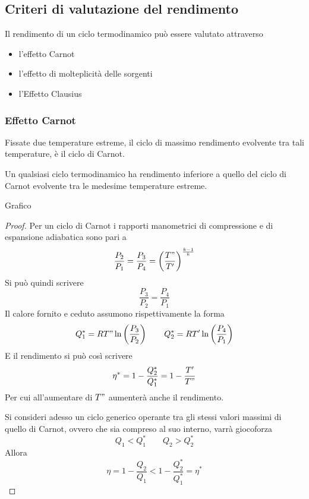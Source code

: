 \subsection{Criteri di valutazione del rendimento}
\begin{adjustwidth}{2in}{}
	Il rendimento di un ciclo termodinamico può essere valutato attraverso 
	\begin{itemize}
		\item l'effetto Carnot
		\item l'effetto di molteplicità delle sorgenti 
		\item l'Effetto Clausius
	\end{itemize}
\end{adjustwidth}





\subsubsection{Effetto Carnot}
\begin{adjustwidth}{2in}{}
	\begin{en}
		Fissate due temperature estreme, il ciclo di massimo rendimento evolvente tra tali temperature, è il ciclo di Carnot. 
		
		Un qualsiasi ciclo termodinamico ha rendimento inferiore a quello del ciclo di Carnot evolvente tra le medesime temperature estreme.
	\end{en}
	
	Grafico
	
	\begin{proof}
		Per un ciclo di Carnot i rapporti manometrici di compressione e di espansione adiabatica sono pari a
		\[\dfrac{P_2}{P_1} = \dfrac{P_3}{P_4} = \left(\dfrac{T"}{T'}\right)^{k-1\over k}\]
		Si può quindi scrivere 
		\[\dfrac{P_3}{P_2} = \dfrac{P_4}{P_1}\]
		Il calore fornito e ceduto assumono rispettivamente la forma 
		\[Q_1^* = RT"\ln\left(\dfrac{P_3}{P_2}\right) \qquad Q_2^* = RT'\ln\left(\dfrac{P_4}{P_1}\right)\]
		E il rendimento si può così scrivere 
		\[\eta^* = 1-\dfrac{Q_2^*}{Q_1^*} = 1- \dfrac{T'}{T"}\]
		Per cui all'aumentare di $T"$ aumenterà anche il rendimento.\newline 
		
		Si consideri adesso un ciclo generico operante tra gli stessi valori massimi di quello di Carnot, ovvero che sia compreso al suo interno, varrà giocoforza 
		\[Q_1<Q_1^* \qquad Q_2>Q_2^*\]
		Allora 
		\[\eta = 1-\dfrac{Q_2}{Q_1} < 1-\dfrac{Q_2^*}{Q_1^*} = \eta^*\]
	\end{proof}	
\end{adjustwidth}




